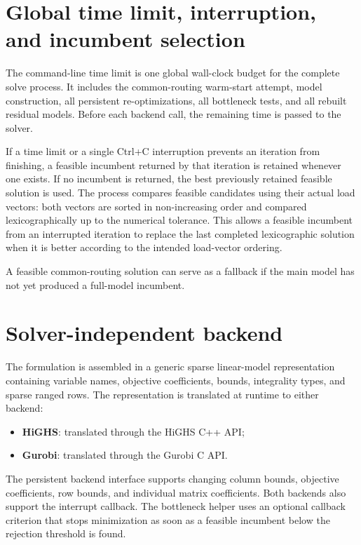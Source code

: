 \documentclass[11pt,a4paper]{article}
\begin{document}
\section{Global time limit, interruption, and incumbent selection}

The command-line time limit is one global wall-clock budget for the complete
solve process. It includes the common-routing warm-start attempt, model
construction, all persistent re-optimizations, all bottleneck tests, and all
rebuilt residual models. Before each backend call, the remaining time is passed
to the solver.

If a time limit or a single Ctrl+C interruption prevents an iteration from
finishing, a feasible incumbent returned by that iteration is retained whenever
one exists. If no incumbent is returned, the best previously retained feasible
solution is used. The process compares feasible candidates using their actual
load vectors: both vectors are sorted in non-increasing order and compared
lexicographically up to the numerical tolerance. This allows a feasible
incumbent from an interrupted iteration to replace the last completed
lexicographic solution when it is better according to the intended load-vector
ordering.

A feasible common-routing solution can serve as a fallback if the main model has
not yet produced a full-model incumbent.

\section{Solver-independent backend}

The formulation is assembled in a generic sparse linear-model representation
containing variable names, objective coefficients, bounds, integrality types,
and sparse ranged rows. The representation is translated at runtime to either
backend:
\begin{itemize}[nosep]
    \item \textbf{HiGHS}: translated through the HiGHS C++ API;
    \item \textbf{Gurobi}: translated through the Gurobi C API.
\end{itemize}

The persistent backend interface supports changing column bounds, objective
coefficients, row bounds, and individual matrix coefficients. Both backends also
support the interrupt callback. The bottleneck helper uses an optional callback
criterion that stops minimization as soon as a feasible incumbent below the
rejection threshold is found.
\end{document}
